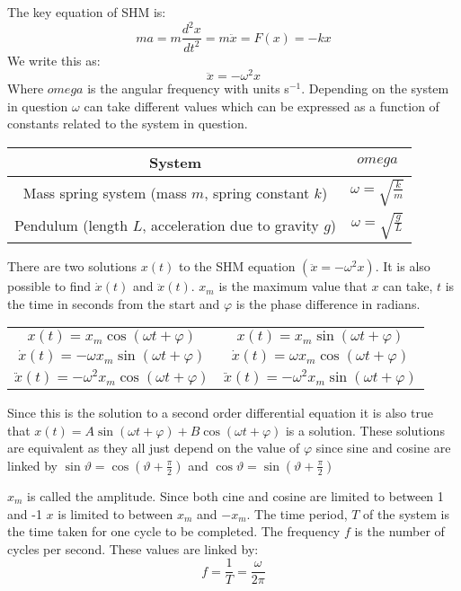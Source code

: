 \documentclass{article}
\begin{document}
The key equation of SHM is:
\[ma=m\frac{d^2x}{dt^2}=m\ddot x=F(x)=-kx\]
We write this as:
\[\ddot x=-\omega^2x\]
Where \(omega\) is the angular frequency with units s\(^{-1}\). Depending on the system in question \(\omega\) can take different values which can be expressed as a function of constants related to the system in question.
\begin{center}
\begin{tabular}{|c|c|}\hline
System & \(omega\) \\ \hline
Mass spring system (mass \(m\), spring constant \(k\))& \(\omega=\sqrt{\frac km}\) \\ \hline
Pendulum (length \(L\), acceleration due to gravity \(g\)) & \(\omega=\sqrt{\frac gL}\) \\ \hline
\end{tabular}
\end{center}
There are two solutions \(x(t)\) to the SHM equation \(\left(\ddot x=-\omega^2x\right)\). It is also possible to find \(\dot{x}(t)\) and \(\ddot{x}(t)\). \(x_m\) is the maximum value that \(x\) can take, \(t\) is the time in seconds from the start and \(\varphi\) is the phase difference in radians.
\begin{center}
\begin{tabular}{|c||c|}\hline
\(x(t)=x_m \cos(\omega t+\varphi)\) & \(x(t)=x_m \sin(\omega t+\varphi)\) \\
\(\dot x(t)=-\omega x_m \sin(\omega t+\varphi)\) & \(\dot x(t)=\omega x_m\cos(\omega t+\varphi)\) \\
\(\ddot x(t)=-\omega^2 x_m \cos(\omega t+\varphi)\) & \(\ddot x(t)=-\omega^2 x_m\sin(\omega t+\varphi)\)\\ \hline
\end{tabular}
\end{center}
Since this is the solution to a second order differential equation it is also true that \(x(t)=A\sin(\omega t+\varphi)+B\cos(\omega t+\varphi)\) is a solution. These solutions are equivalent as they all just depend on the value of \(\varphi\) since sine and cosine are linked by \(\sin\vartheta=\cos(\vartheta+\frac\pi2)\) and \(\cos\vartheta=\sin(\vartheta+\frac\pi2)\)

\(x_m\) is called the amplitude. Since both cine and cosine are limited to between 1 and -1 \(x\) is limited to between \(x_m\) and \(-x_m\). The time period, \(T\) of the system is the time taken for one cycle to be completed. The frequency \(f\) is the number of cycles per second. These values are linked by:
\[f=\frac1T=\frac{\omega}{2\pi}\]
\end{document}
